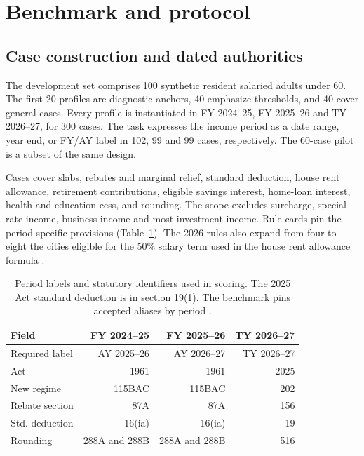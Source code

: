 \documentclass[10pt,letterpaper,twocolumn]{article}
\begin{document}
\section{Benchmark and protocol}

\subsection{Case construction and dated authorities}

The development set comprises 100 synthetic resident salaried adults under 60. The first 20 profiles are diagnostic anchors, 40 emphasize thresholds, and 40 cover general cases. Every profile is instantiated in FY 2024--25, FY 2025--26 and TY 2026--27, for 300 cases. The task expresses the income period as a date range, year end, or FY/AY label in 102, 99 and 99 cases, respectively. The 60-case pilot is a subset of the same design.

Cases cover slabs, rebates and marginal relief, standard deduction, house rent allowance, retirement contributions, eligible savings interest, home-loan interest, health and education cess, and rounding. The scope excludes surcharge, special-rate income, business income and most investment income. Rule cards pin the period-specific provisions (Table~\ref{tab:authorities}). The 2026 rules also expand from four to eight the cities eligible for the 50\% salary term used in the house rent allowance formula \cite{rules2026}.

\begin{table}[!tb]
  \centering\small
  \setlength{\tabcolsep}{3pt}
  \caption{Period labels and statutory identifiers used in scoring. The 2025 Act standard deduction is in section 19(1). The benchmark pins accepted aliases by period \cite{act2025,taxfaq,pib,rules2026}.}
  \label{tab:authorities}
  \begin{tabular*}{\columnwidth}{@{\extracolsep{\fill}}lrrr@{}}
    \toprule
    \textbf{Field} & \textbf{FY 2024--25} & \textbf{FY 2025--26} & \textbf{TY 2026--27} \\
    \midrule
    Required label & AY 2025--26 & AY 2026--27 & TY 2026--27 \\
    Act & 1961 & 1961 & 2025 \\
    New regime & 115BAC & 115BAC & 202 \\
    Rebate section & 87A & 87A & 156 \\
    Std. deduction & 16(ia) & 16(ia) & 19 \\
    Rounding & 288A and 288B & 288A and 288B & 516 \\
    \bottomrule
  \end{tabular*}
\end{table}
\end{document}
